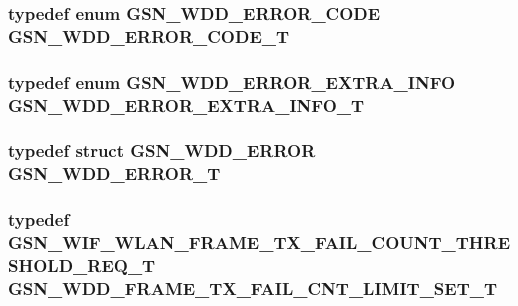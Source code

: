 \hypertarget{a00603_a319a2113768d730bfaa5ab1c954f49c1}{
\subsubsection[{GSN\_\-WDD\_\-ERROR\_\-CODE\_\-T}]{\setlength{\rightskip}{0pt plus 5cm}typedef enum {\bf GSN\_\-WDD\_\-ERROR\_\-CODE} {\bf GSN\_\-WDD\_\-ERROR\_\-CODE\_\-T}}}
\label{a00603_a319a2113768d730bfaa5ab1c954f49c1}
\hypertarget{a00603_af9a6675c005f80382367ca85c5280ad1}{
\subsubsection[{GSN\_\-WDD\_\-ERROR\_\-EXTRA\_\-INFO\_\-T}]{\setlength{\rightskip}{0pt plus 5cm}typedef enum {\bf GSN\_\-WDD\_\-ERROR\_\-EXTRA\_\-INFO} {\bf GSN\_\-WDD\_\-ERROR\_\-EXTRA\_\-INFO\_\-T}}}
\label{a00603_af9a6675c005f80382367ca85c5280ad1}
\hypertarget{a00603_aa95a91b24c682d5580c32e1588d9405e}{
\subsubsection[{GSN\_\-WDD\_\-ERROR\_\-T}]{\setlength{\rightskip}{0pt plus 5cm}typedef struct {\bf GSN\_\-WDD\_\-ERROR} {\bf GSN\_\-WDD\_\-ERROR\_\-T}}}
\label{a00603_aa95a91b24c682d5580c32e1588d9405e}
\hypertarget{a00603_a209fb3e1d53b9efa2241d6fd09de5de3}{
\subsubsection[{GSN\_\-WDD\_\-FRAME\_\-TX\_\-FAIL\_\-CNT\_\-LIMIT\_\-SET\_\-T}]{\setlength{\rightskip}{0pt plus 5cm}typedef {\bf GSN\_\-WIF\_\-WLAN\_\-FRAME\_\-TX\_\-FAIL\_\-COUNT\_\-THRESHOLD\_\-REQ\_\-T} {\bf GSN\_\-WDD\_\-FRAME\_\-TX\_\-FAIL\_\-CNT\_\-LIMIT\_\-SET\_\-T}}}
\label{a00603_a209fb3e1d53b9efa2241d6fd09de5de3}


